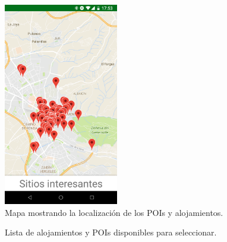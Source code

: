 \newpage
\begin{figure}[H]
	\centering
	\includegraphics[width=50mm]{imagenes/main_activity_map}
	\caption{Mapa mostrando la localización de los POIs y alojamientos.}
	\label{fig:main_activity_map}
\end{figure}
\vspace{0.06in}
\begin{figure}[H]
	\centering
	\caption{Lista de alojamientos y POIs disponibles para seleccionar.}
	\label{fig:main_activity_list}
\end{figure}

